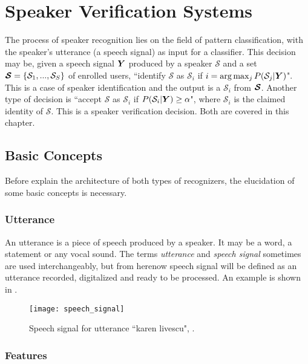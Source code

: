 \chapter{Speaker Verification Systems}
\label{ch:speaker-verification-system}


The process of speaker recognition lies on the field of pattern classification, with the speaker's utterance (a speech signal) as input for a classifier. This decision may be, given a speech signal $\boldsymbol{Y}$ produced by a speaker $\mathcal{S}$ and a set $\boldsymbol{\mathcal{S}} = \{\mathcal{S}_1, ..., \mathcal{S}_S\}$ of enrolled users, ``identify $\mathcal{S}$ as $\mathcal{S}_i$ if $i = \arg\max_j P(\mathcal{S}_j|\boldsymbol{Y})$". This is a case of speaker identification and the output is a $\mathcal{S}_i$ from $\boldsymbol{\mathcal{S}}$. Another type of decision is ``accept $\mathcal{S}$ as $\mathcal{S}_i$ if $P(\mathcal{S}_i|\boldsymbol{Y}) \geq \alpha$", where $\mathcal{S}_i$ is the claimed identity of $\mathcal{S}$. This is a speaker verification decision. Both are covered in this chapter.

\section{Basic Concepts}

Before explain the architecture of both types of recognizers, the elucidation of some basic concepts is necessary.

\subsection{Utterance}

An utterance is a piece of speech produced by a speaker. It may be a word, a statement or any vocal sound. The terms \emph{utterance} and \emph{speech signal} sometimes are used interchangeably, but from herenow speech signal will be defined as an utterance recorded, digitalized and ready to be processed. An example is shown in .

\begin{figure}[ht]
    \centering
    \texttt{[image: speech\_signal]}
    \caption{Speech signal for utterance ``karen livescu", .}
    \label{fig:speech_signal}
\end{figure}

\subsection{Features}

